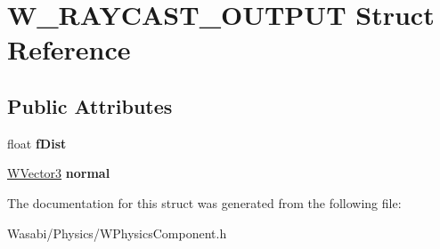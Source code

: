 \hypertarget{struct_w___r_a_y_c_a_s_t___o_u_t_p_u_t}{}\section{W\+\_\+\+R\+A\+Y\+C\+A\+S\+T\+\_\+\+O\+U\+T\+P\+UT Struct Reference}
\label{struct_w___r_a_y_c_a_s_t___o_u_t_p_u_t}
\subsection*{Public Attributes}
\begin{DoxyCompactItemize}
\item 
float {\bfseries f\+Dist}\hypertarget{struct_w___r_a_y_c_a_s_t___o_u_t_p_u_t_a0162727e6735f350b4f2b3433880d30d}{}\label{struct_w___r_a_y_c_a_s_t___o_u_t_p_u_t_a0162727e6735f350b4f2b3433880d30d}

\item 
\hyperlink{class_w_vector3}{W\+Vector3} {\bfseries normal}\hypertarget{struct_w___r_a_y_c_a_s_t___o_u_t_p_u_t_a5e740ce2a9006f7f3dc2020c4f57f172}{}\label{struct_w___r_a_y_c_a_s_t___o_u_t_p_u_t_a5e740ce2a9006f7f3dc2020c4f57f172}

\end{DoxyCompactItemize}


The documentation for this struct was generated from the following file\+:\begin{DoxyCompactItemize}
\item 
Wasabi/\+Physics/W\+Physics\+Component.\+h\end{DoxyCompactItemize}
